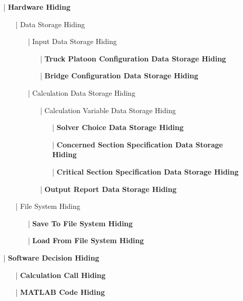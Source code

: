\documentclass[12pt, titlepage]{article}
\begin{document}
\begin{enumerate}
    \item[|] \textbf{Hardware Hiding}
    \begin{enumerate}
        \item[|] Data Storage Hiding
        \begin{enumerate}
            \item[|] Input Data Storage Hiding
            \begin{enumerate}
                \item[|] \textbf{Truck Platoon Configuration Data Storage Hiding}
                \item[|] \textbf{Bridge Configuration Data Storage Hiding}
            \end{enumerate}
            \item[|] Calculation Data Storage Hiding
            \begin{enumerate}
                \item[|] Calculation Variable Data Storage Hiding
                \begin{itemize}
                    \item[|] \textbf{Solver Choice Data Storage Hiding}
                    \item[|] \textbf{Concerned Section Specification Data Storage Hiding}
                    \item[|] \textbf{Critical Section Specification Data Storage Hiding}
                \end{itemize}
                \item[|] \textbf{Output Report Data Storage Hiding}
            \end{enumerate}
        \end{enumerate}
        \item[|] File System Hiding
        \begin{enumerate}
            \item[|] \textbf{Save To File System Hiding}
            \item[|] \textbf{Load From File System Hiding} 
        \end{enumerate}
    \end{enumerate}
    \item[|] \textbf{Software Decision Hiding}
    \begin{enumerate}
        \item[|] \textbf{Calculation Call Hiding}
        \item[|] \textbf{MATLAB Code Hiding}

\end{enumerate}
\end{enumerate}
\end{document}
